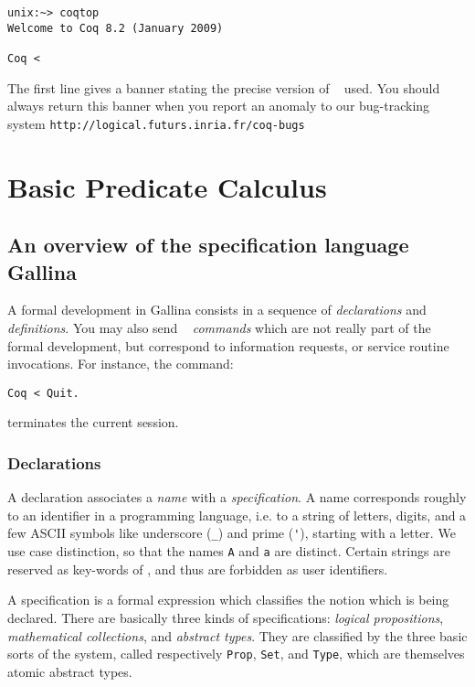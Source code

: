 \documentclass[11pt,a4paper]{book}
\begin{document}
\begin{small}
\begin{flushleft}
\begin{verbatim}
unix:~> coqtop
Welcome to Coq 8.2 (January 2009)

Coq < 
\end{verbatim}
\end{flushleft}
\end{small}

The first line gives a banner stating the precise version of \Coq~
used. You should always return this banner when you report an anomaly
to our bug-tracking system
\verb|http://logical.futurs.inria.fr/coq-bugs|

\chapter{Basic Predicate Calculus}

\section{An overview of the specification language Gallina}

A formal development in Gallina consists in a sequence of {\sl declarations}
and {\sl definitions}. You may also send \Coq~ {\sl commands} which are
not really part of the formal development, but correspond to information
requests, or service routine invocations. For instance, the command:
\begin{verbatim}
Coq < Quit.
\end{verbatim}
terminates the current session.

\subsection{Declarations}

A declaration associates a {\sl name} with 
a {\sl specification}. 
A name corresponds roughly to an identifier in a programming
language, i.e. to a string of letters, digits, and a few ASCII symbols like
underscore (\verb"_") and prime (\verb"'"), starting with a letter. 
We use case distinction, so that the names \verb"A" and \verb"a" are distinct.
Certain strings are reserved as key-words of \Coq, and thus are forbidden 
as user identifiers.

A specification is a formal expression which classifies the notion which is
being declared. There are basically three kinds of specifications: 
{\sl logical propositions}, {\sl mathematical collections}, and
{\sl abstract types}. They are classified by the three basic sorts
of the system, called respectively \verb:Prop:, \verb:Set:, and
\verb:Type:, which are themselves atomic abstract types.
\end{document}
